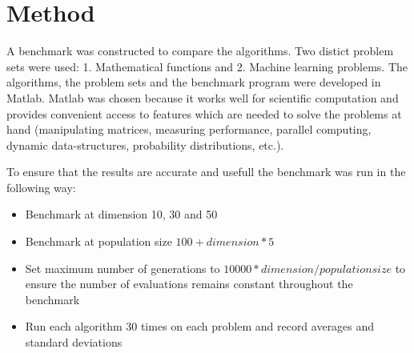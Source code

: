 \section{Method}

A benchmark was constructed to compare the algorithms. Two distict problem sets were used: 1. Mathematical functions and 2. Machine learning problems. The algorithms, the problem sets and the benchmark program were developed in Matlab. Matlab was chosen because it works well for scientific computation and provides convenient access to features which are needed to solve the problems at hand (manipulating matrices, measuring performance, parallel computing, dynamic data-structures, probability distributions, etc.).

To ensure that the results are accurate and usefull the benchmark was run in the following way:

\begin{itemize}
  \item Benchmark at dimension 10, 30 and 50
  \item Benchmark at population size $100 + dimension * 5$
  \item Set maximum number of generations to $10000 * dimension / population size$ to ensure the number of evaluations remains constant throughout the benchmark
  \item Run each algorithm 30 times on each problem and record averages and standard deviations
\end{itemize}

